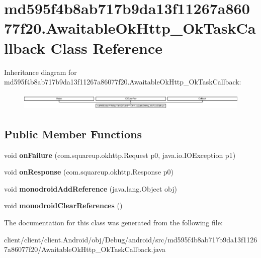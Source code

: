 \hypertarget{classmd595f4b8ab717b9da13f11267a86077f20_1_1AwaitableOkHttp__OkTaskCallback}{}\section{md595f4b8ab717b9da13f11267a86077f20.\+Awaitable\+Ok\+Http\+\_\+\+Ok\+Task\+Callback Class Reference}
\label{classmd595f4b8ab717b9da13f11267a86077f20_1_1AwaitableOkHttp__OkTaskCallback}
Inheritance diagram for md595f4b8ab717b9da13f11267a86077f20.\+Awaitable\+Ok\+Http\+\_\+\+Ok\+Task\+Callback\+:\begin{figure}[H]
\begin{center}
\leavevmode
\includegraphics[height=0.824135cm]{classmd595f4b8ab717b9da13f11267a86077f20_1_1AwaitableOkHttp__OkTaskCallback}
\end{center}
\end{figure}
\subsection*{Public Member Functions}
\begin{DoxyCompactItemize}
\item 
\hypertarget{classmd595f4b8ab717b9da13f11267a86077f20_1_1AwaitableOkHttp__OkTaskCallback_a309790f78ca97412c48358f64a7b699c}{}void {\bfseries on\+Failure} (com.\+squareup.\+okhttp.\+Request p0, java.\+io.\+I\+O\+Exception p1)\label{classmd595f4b8ab717b9da13f11267a86077f20_1_1AwaitableOkHttp__OkTaskCallback_a309790f78ca97412c48358f64a7b699c}

\item 
\hypertarget{classmd595f4b8ab717b9da13f11267a86077f20_1_1AwaitableOkHttp__OkTaskCallback_a32aecf6f41e5a49d4a5773335e772a48}{}void {\bfseries on\+Response} (com.\+squareup.\+okhttp.\+Response p0)\label{classmd595f4b8ab717b9da13f11267a86077f20_1_1AwaitableOkHttp__OkTaskCallback_a32aecf6f41e5a49d4a5773335e772a48}

\item 
\hypertarget{classmd595f4b8ab717b9da13f11267a86077f20_1_1AwaitableOkHttp__OkTaskCallback_aee8fa4bcb9c0f022618b2043b18c03a6}{}void {\bfseries monodroid\+Add\+Reference} (java.\+lang.\+Object obj)\label{classmd595f4b8ab717b9da13f11267a86077f20_1_1AwaitableOkHttp__OkTaskCallback_aee8fa4bcb9c0f022618b2043b18c03a6}

\item 
\hypertarget{classmd595f4b8ab717b9da13f11267a86077f20_1_1AwaitableOkHttp__OkTaskCallback_a89e67be86a926364ef6e8ee58a462dd9}{}void {\bfseries monodroid\+Clear\+References} ()\label{classmd595f4b8ab717b9da13f11267a86077f20_1_1AwaitableOkHttp__OkTaskCallback_a89e67be86a926364ef6e8ee58a462dd9}

\end{DoxyCompactItemize}


The documentation for this class was generated from the following file\+:\begin{DoxyCompactItemize}
\item 
client/client/client.\+Android/obj/\+Debug/android/src/md595f4b8ab717b9da13f11267a86077f20/Awaitable\+Ok\+Http\+\_\+\+Ok\+Task\+Callback.\+java\end{DoxyCompactItemize}
